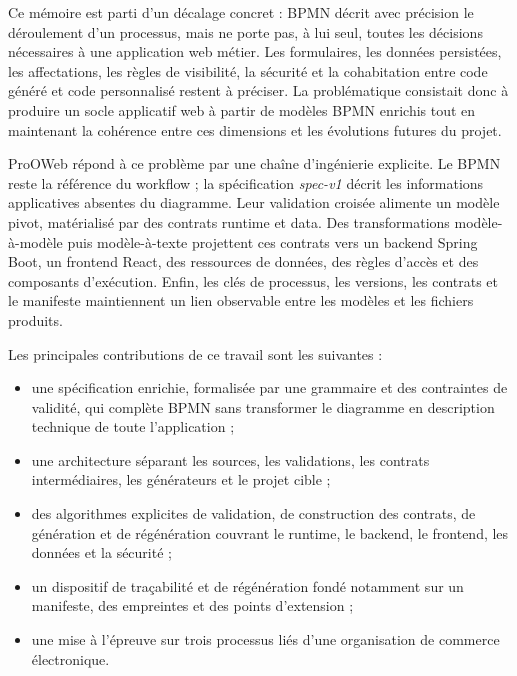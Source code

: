 

Ce mémoire est parti d'un décalage concret : BPMN décrit avec précision le
déroulement d'un processus, mais ne porte pas, à lui seul, toutes les décisions
nécessaires à une application web métier. Les formulaires, les données
persistées, les affectations, les règles de visibilité, la sécurité et la
cohabitation entre code généré et code personnalisé restent à préciser. La
problématique consistait donc à produire un socle applicatif web à partir de
modèles BPMN enrichis tout en maintenant la cohérence entre ces dimensions et
les évolutions futures du projet.

ProOWeb répond à ce problème par une chaîne d'ingénierie explicite. Le BPMN
reste la référence du workflow ; la spécification \textit{spec-v1} décrit les
informations applicatives absentes du diagramme. Leur validation croisée
alimente un modèle pivot, matérialisé par des contrats runtime et data. Des
transformations modèle-à-modèle puis modèle-à-texte projettent ces contrats vers
un backend Spring Boot, un frontend React, des ressources de données, des règles
d'accès et des composants d'exécution. Enfin, les clés de processus, les
versions, les contrats et le manifeste maintiennent un lien observable entre
les modèles et les fichiers produits.

Les principales contributions de ce travail sont les suivantes :
\begin{itemize}
    \item une spécification enrichie, formalisée par une grammaire et des contraintes de validité, qui complète BPMN sans transformer le diagramme en description technique de toute l'application ;
    \item une architecture séparant les sources, les validations, les contrats intermédiaires, les générateurs et le projet cible ;
    \item des algorithmes explicites de validation, de construction des contrats, de génération et de régénération couvrant le runtime, le backend, le frontend, les données et la sécurité ;
    \item un dispositif de traçabilité et de régénération fondé notamment sur un manifeste, des empreintes et des points d'extension ;
    \item une mise à l'épreuve sur trois processus liés d'une organisation de commerce électronique.
\end{itemize}

